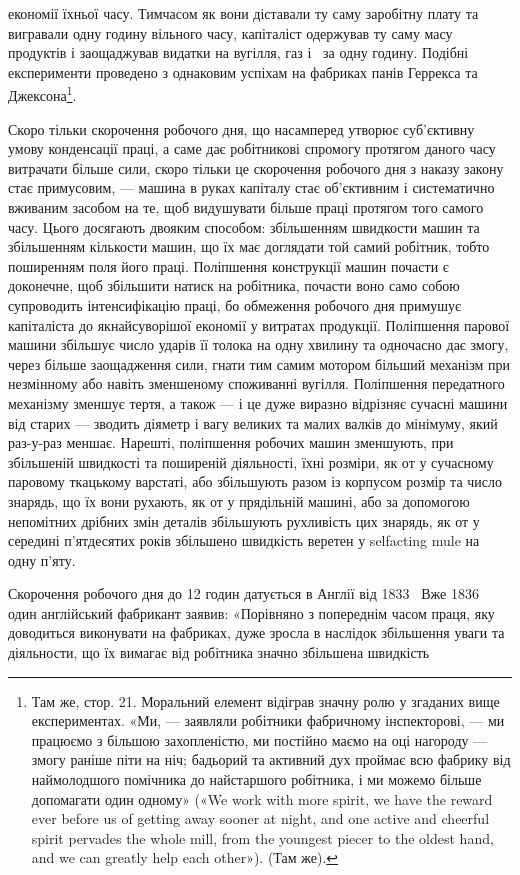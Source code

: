 \parcont{}  %
економії їхньої часу. Тимчасом як вони діставали ту саму заробітну
плату та вигравали одну годину вільного часу, капіталіст
одержував ту саму масу продуктів і заощаджував видатки на
вугілля, газ і~ за одну годину. Подібні експерименти проведено
з однаковим успіхам на фабриках панів Геррекса та
Джексона\footnote{
Там же, стор. 21. Моральний елемент відіграв значну ролю у
згаданих вище експериментах. «Ми, — заявляли робітники фабричному
інспекторові, — ми працюємо з більшою захопленістю, ми постійно маємо
на оці нагороду — змогу раніше піти на ніч; бадьорий та активний
дух проймає всю фабрику від наймолодшого помічника до найстаршого
робітника, і ми можемо більше допомагати один одному» («We work with
more spirit, we have the reward ever before us of getting away sooner at
night, and one active and cheerful spirit pervades the whole mill, from the
youngest piecer to the oldest hand, and we can greatly help each other»).
(Там же).
}.

Скоро тільки скорочення робочого дня, що насамперед утворює
суб’єктивну умову конденсації праці, а саме дає робітникові
спромогу протягом даного часу витрачати більше сили, скоро
тільки це скорочення робочого дня з наказу закону стає примусовим,
— машина в руках капіталу стає об’єктивним і систематично
вживаним засобом на те, щоб видушувати більше праці
протягом того самого часу. Цього досягають двояким способом:
збільшенням швидкости машин та збільшенням кількости машин,
що їх має доглядати той самий робітник, тобто поширенням поля
його праці. Поліпшення конструкції машин почасти є доконечне,
щоб збільшити натиск на робітника, почасти воно само собою
супроводить інтенсифікацію праці, бо обмеження робочого дня
примушує капіталіста до якнайсуворішої економії у витратах
продукції. Поліпшення парової машини збільшує число ударів
її толока на одну хвилину та одночасно дає змогу, через більше
заощадження сили, гнати тим самим мотором більший механізм
при незмінному або навіть зменшеному споживанні вугілля.
Поліпшення передатного механізму зменшує тертя, а також — і це
дуже виразно відрізняє сучасні машини від старих — зводить
діяметр і вагу великих та малих валків до мінімуму, який раз-у-раз
меншає. Нарешті, поліпшення робочих машин зменшують,
при збільшеній швидкості та поширеній діяльності, їхні розміри,
як от у сучасному паровому ткацькому варстаті, або збільшують
разом із корпусом розмір та число знарядь, що їх вони рухають,
як от у прядільній машині, або за допомогою непомітних дрібних
змін деталів збільшують рухливість цих знарядь, як от у середині
п’ятдесятих років збільшено швидкість веретен у selfacting mule
на одну п’яту.

Скорочення робочого дня до 12 годин датується в Англії від
1833~ Вже 1836~ один англійський фабрикант заявив: «Порівняно
з попереднім часом праця, яку доводиться виконувати на
фабриках, дуже зросла в наслідок збільшення уваги та діяльности,
що їх вимагає від робітника значно збільшена швидкість
\parbreak{}  %

